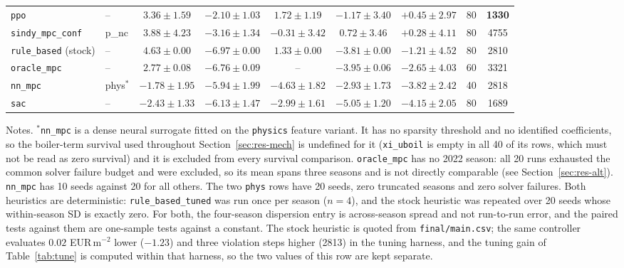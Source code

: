 \begin{table}[t]
\begin{tabular}{@{}llcccccrc@{}}
\texttt{ppo}                     & -- & $3.36\pm1.59$ & $-2.10\pm1.03$ & $1.72\pm1.19$ & $-1.17\pm3.40$& $+0.45\pm2.97$ & 80 & \textbf{1330} \\
\texttt{sindy\_mpc\_conf}        & p\_nc & $3.88\pm4.23$ & $-3.16\pm1.34$ & $-0.31\pm3.42$& $0.72\pm3.46$ & $+0.28\pm4.11$ & 80 & 4755 \\
\texttt{rule\_based} (stock)     & -- & $4.63\pm0.00$ & $-6.97\pm0.00$ & $1.33\pm0.00$ & $-3.81\pm0.00$& $-1.21\pm4.52$ & 80 & 2810 \\
\texttt{oracle\_mpc}             & -- & $2.77\pm0.08$ & $-6.76\pm0.09$ & -- & $-3.95\pm0.06$& $-2.65\pm4.03$ & 60 & 3321 \\
\texttt{nn\_mpc}                 & phys$^{*}$ & $-1.78\pm1.95$& $-5.94\pm1.99$ & $-4.63\pm1.82$& $-2.93\pm1.73$& $-3.82\pm2.42$ & 40 & 2818 \\
\texttt{sac}                     & -- & $-2.43\pm1.33$& $-6.13\pm1.47$ & $-2.99\pm1.61$& $-5.05\pm1.20$& $-4.15\pm2.05$ & 80 & 1689 \\
\bottomrule
\end{tabular}

\vspace{2pt}
\begin{minipage}{\linewidth}\scriptsize
Notes. $^{*}$\texttt{nn\_mpc} is a dense neural surrogate fitted on the \texttt{physics}
feature variant. It has no sparsity threshold and no identified coefficients, so the
boiler-term survival used throughout Section~\ref{sec:res-mech} is undefined for it
(\texttt{xi\_uboil} is empty in all 40 of its rows, which must not be read as zero
survival) and it is excluded from every survival comparison.
\texttt{oracle\_mpc} has no 2022 season: all 20 runs exhausted the common solver
failure budget and were excluded, so its mean spans three seasons and is not directly
comparable (see Section~\ref{sec:res-alt}). \texttt{nn\_mpc} has 10 seeds against 20 for
all others. The two \texttt{phys} rows have 20 seeds, zero truncated seasons and zero
solver failures. Both heuristics are deterministic: \texttt{rule\_based\_tuned} was run once per
season ($n=4$), and the stock heuristic was repeated over 20 seeds whose within-season SD
is exactly zero. For both, the four-season dispersion entry is across-season spread and
not run-to-run error, and the paired tests against them are one-sample tests against a
constant. The stock heuristic is quoted from \texttt{final/main.csv}; the same
controller evaluates $0.02$ EUR\,m$^{-2}$ lower ($-1.23$) and three violation steps higher
(2813) in the tuning harness, and the tuning gain of Table~\ref{tab:tune} is computed
within that harness, so the two values of this row are kept separate.
\end{minipage}
\end{table}

